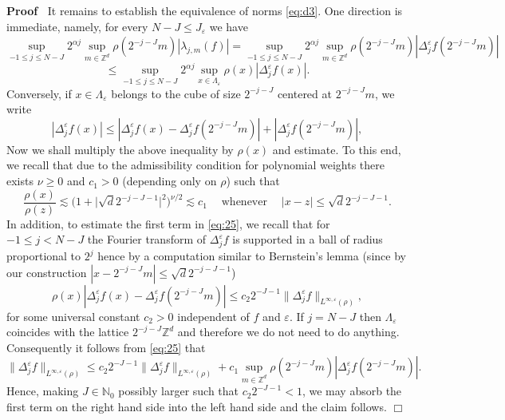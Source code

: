 \documentclass[a4paper,11pt]{article}
\newcommand{\tmop}[1]{\ensuremath{\operatorname{#1}}}
\newenvironment{proof}{\noindent\textbf{Proof\ }}{\hspace*{\fill}$\Box$\medskip}
\numberwithin{equation}{section}
\begin{document}
\begin{proof}
  It remains to establish the equivalence of norms {\eqref{eq:d3}}. One
  direction is immediate, namely, for every $N - J \leqslant J_{\varepsilon}$
  we have
  \[ \sup_{- 1 \leqslant j \leqslant N - J} 2^{\alpha j} \sup_{m \in
     \mathbb{Z}^d} \rho (2^{- j - J} m) | \lambda_{j, m} (f) | = \sup_{- 1
     \leqslant j \leqslant N - J} 2^{\alpha j} \sup_{m \in \mathbb{Z}^d} \rho
     (2^{- j - J} m) | \Delta^{\varepsilon}_j f (2^{- j - J} m) | \]
  \[ \leqslant \sup_{- 1 \leqslant j \leqslant N - J} 2^{\alpha j} \sup_{x \in
     \Lambda_{\varepsilon}} \rho (x) | \Delta^{\varepsilon}_j f (x) | . \]
  Conversely, if $x \in \Lambda_{\varepsilon}$ belongs to the cube of size
  $2^{- j - J}$ centered at $2^{- j - J} m$, we write
  \begin{equation}
    | \Delta^{\varepsilon}_j f (x) | \leqslant | \Delta^{\varepsilon}_j f (x)
    - \Delta^{\varepsilon}_j f (2^{- j - J} m) | + | \Delta^{\varepsilon}_j f
    (2^{- j - J} m) |, \label{eq:25}
  \end{equation}
  Now we shall multiply the above inequality by $\rho (x)$ and estimate. To
  this end, we recall that due to the admissibility condition for polynomial
  weights there exists $\nu \geqslant 0$ and $c_1 > 0$ (depending only on
  $\rho$) such that
  \[ \frac{\rho (x)}{\rho (z)} \lesssim \big( 1 + \big| \sqrt{d} 2^{- j - J
     - 1} \big|^2 \big)^{\nu / 2} \lesssim c_1 \quad \tmop{whenever} \quad
     | x - z | \leqslant \sqrt{d} 2^{- j - J - 1} . \]
  In addition, to estimate the first term in {\eqref{eq:25}}, we recall that
  for $- 1 \leqslant j < N - J$ the Fourier transform of
  $\Delta^{\varepsilon}_j f$ is supported in a ball of radius proportional to
  $2^j$ hence by a computation similar to Bernstein's lemma (since by our
  construction $| x - 2^{- j - J} m | \leqslant \sqrt{d} 2^{- j - J - 1}$)
  \[ \rho (x) | \Delta^{\varepsilon}_j f (x) - \Delta^{\varepsilon}_j f (2^{-
     j - J} m) | \leqslant c_2 2^{- J - 1} \| \Delta^{\varepsilon}_j f
     \|_{L^{\infty, \varepsilon} (\rho)}, \]
  for some universal constant $c_2 > 0$ independent of $f$ and $\varepsilon$.
  If $j = N - J$ then $\Lambda_{\varepsilon}$ coincides with the lattice $2^{-
  j - J} \mathbb{Z}^d$ and therefore we do not need to do anything.
  Consequently it follows from {\eqref{eq:25}} that
  \[ \| \Delta^{\varepsilon}_j f \|_{L^{\infty, \varepsilon} (\rho)} \leqslant
     c_2 2^{- J - 1} \| \Delta^{\varepsilon}_j f \|_{L^{\infty, \varepsilon}
     (\rho)} + c_1 \sup_{m \in \mathbb{Z}^d} \rho (2^{- j - J} m) |
     \Delta^{\varepsilon}_j f (2^{- j - J} m) | . \]
  Hence, making $J \in \mathbb{N}_0$ possibly larger such that $c_2 2^{- J -
  1} < 1$, we may absorb the first term on the right hand side into the left
  hand side and the claim follows.
  \end{proof}
  
\end{document}
